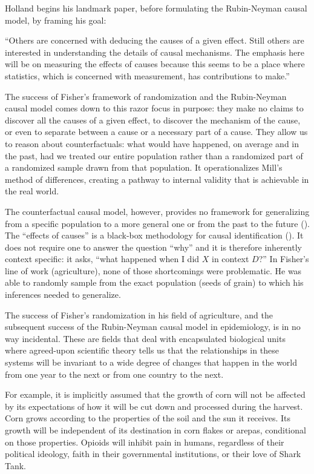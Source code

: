\documentclass[a4paper,12pt]{article}
\begin{document}
Holland \parencite*{Holland1986} begins his landmark paper, before formulating the Rubin-Neyman causal model, by framing his goal:

\begin{displayquote}
``Others are concerned with deducing the causes of a given effect. Still others are interested in understanding the details of causal mechanisms. The emphasis here will be on measuring the effects of causes because this seems to be a place where statistics, which is concerned with measurement, has contributions to make.''
\end{displayquote}

The success of Fisher's framework of randomization and the Rubin-Neyman causal model comes down to this razor focus in purpose: they make no claims to discover all the causes of a given effect, to discover the mechanism of the cause, or even to separate between a cause or a necessary part of a cause. They allow us to reason about counterfactuals: what would have happened, on average and in the past, had we treated our entire population rather than a randomized part of a randomized sample drawn from that population. It operationalizes Mill's method of differences, creating a pathway to internal validity that is achievable in the real world.

The counterfactual causal model, however, provides no framework for generalizing from a specific population to a more general one or from the past to the future (\cite{Heckman2008}). The ``effects of causes'' is a black-box methodology for causal identification  (\cite{Heckman1995}). It does not require one to answer the question ``why'' and it is therefore inherently context specific: it asks, ``what happened when I did $X$ in context $D$?'' In Fisher's line of work (agriculture), none of those shortcomings were problematic. He was able to randomly sample from the exact population (seeds of grain) to which his inferences needed to generalize.

The success of Fisher's randomization in his field of agriculture, and the subsequent success of the Rubin-Neyman causal model in epidemiology, is in no way incidental. These are fields that deal with encapsulated biological units where agreed-upon scientific theory tells us that the relationships in these systems will be invariant to a wide degree of changes that happen in the world from one year to the next or from one country to the next.

For example, it is implicitly assumed that the growth of corn will not be affected by its expectations of how it will be cut down and processed during the harvest. Corn grows according to the properties of the soil and the sun it receives. Its growth will be independent of its destination in corn flakes or arepas, conditional on those properties. Opioids will inhibit pain in humans, regardless of their political ideology, faith in their governmental institutions, or their love of Shark Tank.
\end{document}

